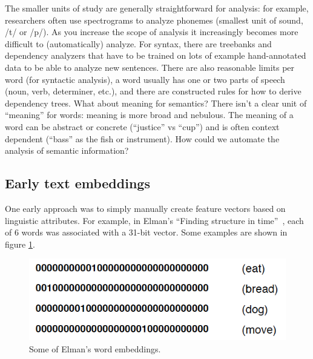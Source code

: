 The smaller units of study are generally straightforward for analysis: for example, researchers often use spectrograms to analyze phonemes (smallest unit of sound, /t/ or /p/). As you increase the scope of analysis it increasingly becomes more difficult to (automatically) analyze. For syntax, there are treebanks and dependency analyzers that have to be trained on lots of example hand-annotated data to be able to analyze new sentences. There are also reasonable limits per word (for syntactic analysis), a word usually has one or two parts of speech (noun, verb, determiner, etc.), and there are constructed rules for how to derive dependency trees. What about meaning for semantics? There isn't a clear unit of ``meaning'' for words: meaning is more broad and nebulous. The meaning of a word can be abstract or concrete (``justice'' vs ``cup'') and is often context dependent (``bass'' as the fish or instrument). How could we automate the analysis of semantic information?



\subsection{Early text embeddings}

One early approach was to simply manually create feature vectors based on linguistic attributes.  For example, in Elman's ``Finding structure in time''~\cite{elman1990finding}, each of 6 words was associated with a 31-bit vector.  Some examples are shown in figure \ref{elmanWordEmbeddings}.

\begin{figure}[h]
\centering
\includegraphics[scale=.5]{./images/elmanWordEmbeddings.png}
\caption[From \cite{elman1990finding}.]{Some of Elman's word embeddings. }
\label{elmanWordEmbeddings}
\end{figure}

